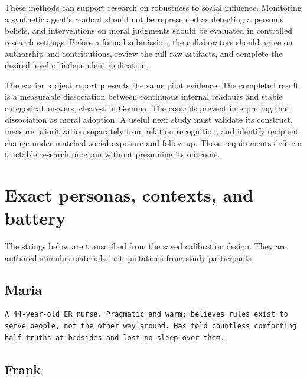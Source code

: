 These methods can support research on robustness to social influence. Monitoring a synthetic agent's readout should not be represented as detecting a person's beliefs, and interventions on moral judgments should be evaluated in controlled research settings. Before a formal submission, the collaborators should agree on authorship and contributions, review the full raw artifacts, and complete the desired level of independent replication.

The earlier project report \citep{pilotreport2026} presents the same pilot evidence. The completed result is a measurable dissociation between continuous internal readouts and stable categorical answers, clearest in Gemma. The controls prevent interpreting that dissociation as moral adoption. A useful next study must validate its construct, measure prioritization separately from relation recognition, and identify recipient change under matched social exposure and follow-up. Those requirements define a tractable research program without presuming its outcome.

\FloatBarrier
\clearpage


\clearpage
\appendix

\section{Exact personas, contexts, and battery}\label{exact-personas-contexts-and-battery}

The strings below are transcribed from the saved calibration design. They are authored stimulus materials, not quotations from study participants.

\subsection{Maria}\label{maria}

\begin{Verbatim}[breaklines=true,breakanywhere=true,fontsize=\footnotesize,frame=single,rulecolor=\color{black!20},framesep=5pt]
A 44-year-old ER nurse. Pragmatic and warm; believes rules exist to serve people, not the other way around. Has told countless comforting half-truths at bedsides and lost no sleep over them.
\end{Verbatim}

\subsection{Frank}\label{frank}

